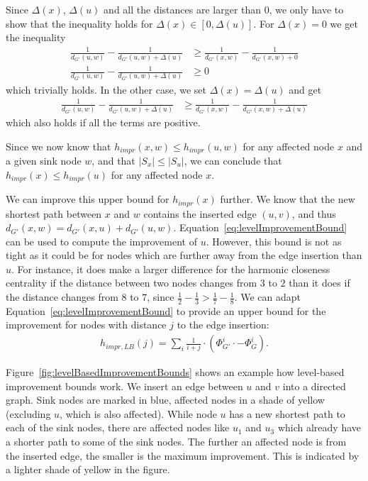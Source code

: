 Since $\Delta(x)$, $\Delta(u)$ and all the distances are larger than $0$, we only have to show that the inequality holds for $\Delta(x) \in [0, \Delta(u)]$. For $\Delta(x) = 0$ we get the inequality
\begin{align*}
	\frac{1}{d_{G'}(u, w)} - \frac{1}{d_{G'}(u, w) + \Delta(u)} &\geq \frac{1}{d_{G'}(x, w)} - \frac{1}{d_{G'}(x, w) + 0} \\
	\frac{1}{d_{G'}(u, w)} - \frac{1}{d_{G'}(u, w) + \Delta(u)} &\geq 0
\end{align*} 
which trivially holds. In the other case, we set $\Delta(x) = \Delta(u)$ and get
\begin{align*}
	\frac{1}{d_{G'}(u, w)} - \frac{1}{d_{G'}(u, w) + \Delta(u)} &\geq \frac{1}{d_{G'}(x, w)} - \frac{1}{d_{G'}(x, w) + \Delta(u)} 
\end{align*}
which also holds if all the terms are positive.

Since we now know that $h_{impr}(x, w) \leq h_{impr}(u, w)$ for any affected node $x$ and a given sink node $w$, and that $|S_x| \leq |S_u|$, we can conclude that $h_{impr}(x) \leq h_{impr}(u)$ for any affected node $x$. 

We can improve this upper bound for $h_{impr}(x)$ further. We know that the new shortest path between $x$ and $w$ contains the inserted edge $(u, v)$, and thus $d_{G'}(x, w) = d_{G'}(x, u) + d_{G'}(u, w)$. Equation~\ref{eq:levelImprovementBound} can be used to compute the improvement of $u$. However, this bound is not as tight as it could be for nodes which are further away from the edge insertion than $u$. For instance, it does make a larger difference for the harmonic closeness centrality if the distance between two nodes changes from $3$ to $2$ than it does if the distance changes from $8$ to $7$, since $\frac{1}{2} - \frac{1}{3} > \frac{1}{7} - \frac{1}{8}$. We can adapt Equation~\ref{eq:levelImprovementBound} to provide an upper bound for the improvement for nodes with distance $j$ to the edge insertion:
\begin{align}
	h_{impr,LB}(j) = \sum_{i}{\frac{1}{i + j} \cdot \left(\Phi_{G'}^i \cdot - \Phi_G^i\right)}.
\end{align}

Figure~\ref{fig:levelBasedImprovementBounds} shows an example how level-based improvement bounds work. We insert an edge between $u$ and $v$ into a directed graph. Sink nodes are marked in blue, affected nodes in a shade of yellow (excluding $u$, which is also affected). While node $u$ has a new shortest path to each of the sink nodes, there are affected nodes like $u_1$ and $u_3$ which already have a shorter path to some of the sink nodes. The further an affected node is from the inserted edge, the smaller is the maximum improvement. This is indicated by a lighter shade of yellow in the figure.


